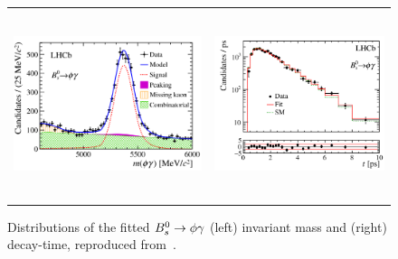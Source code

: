 \begin{figure}
  \begin{center}
    \begin{tabular}{c c}
      \includegraphics[height=5.5cm]{figs/phigammamass.png} &
      \includegraphics[height=5.5cm]{figs/phigammatime.png} 
    \end{tabular}
  \end{center}
  \vspace{-0.75cm}
  \caption{\label{phigammamasstime}Distributions of the fitted ${B}^0_s \rightarrow \phi \gamma$ (left) invariant mass and (right) decay-time, reproduced from~\cite{}.}
\end{figure}
